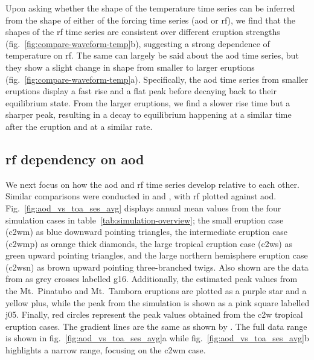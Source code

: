\documentclass{ametsocV6.1}
\begin{document}
Upon asking whether the shape of the temperature time series can be inferred from the
shape of either of the forcing time series (\gls{aod} or \gls{rf}), we find that the
shapes of the \gls{rf} time series are consistent over different eruption strengths
(fig.~\ref{fig:compare-waveform-temp}b), suggesting a strong dependence of temperature
on \gls{rf}. The same can largely be said about the \gls{aod} time series, but they show
a slight change in shape from smaller to larger eruptions
(fig.~\ref{fig:compare-waveform-temp}a). Specifically, the \gls{aod} time series from
smaller eruptions display a fast rise and a flat peak before decaying back to their
equilibrium state. From the larger eruptions, we find a slower rise time but a sharper
peak, resulting in a decay to equilibrium happening at a similar time after the eruption
and at a similar rate.

\subsection{\gls{rf} dependency on \gls{aod}}

We next focus on how the \gls{aod} and \gls{rf} time series develop relative to each
other. Similar comparisons were conducted in \citet[][their Fig.\ 4]{gregory2016} and
\citet[][their Fig.\ 1]{marshall2020}, with \gls{rf} plotted against \gls{aod}.
Fig.~\ref{fig:aod_vs_toa_ses_avg} displays annual mean values from the four simulation
cases in table~\ref{tab:simulation-overview}; the small eruption case (\gls{c2wm}) as
blue downward pointing triangles, the intermediate eruption case (\gls{c2wmp}) as orange
thick diamonds, the large tropical eruption case (\gls{c2ws}) as green upward pointing
triangles, and the large northern hemisphere eruption case (\gls{c2wsn}) as brown upward
pointing three-branched twigs. Also shown are the data from \citet[][Fig.\ 4, black
  crosses from HadCM3 sstPiHistVol]{gregory2016} as grey crosses labelled \gls{g16}.
Additionally, the estimated peak values from the Mt.\ Pinatubo and Mt.\ Tambora
eruptions are plotted as a purple star and a yellow plus, while the peak from the
\citet{jones2005} simulation is shown as a pink square labelled \gls{j05}. Finally, red
circles represent the peak values obtained from the \gls{c2w} tropical eruption cases.
The gradient lines are the same as shown by \citet{gregory2016}. The full data range is
shown in fig.~\ref{fig:aod_vs_toa_ses_avg}a while fig.~\ref{fig:aod_vs_toa_ses_avg}b
highlights a narrow range, focusing on the \gls{c2wm} case.
\end{document}
